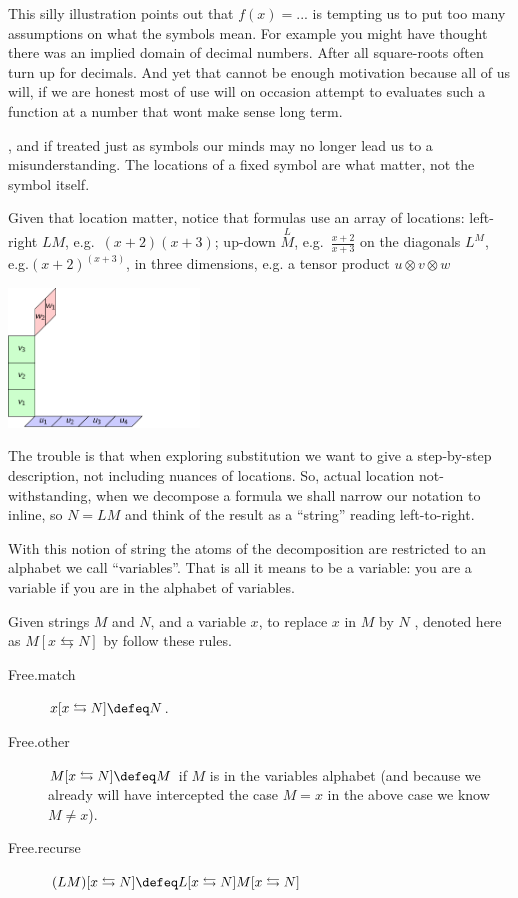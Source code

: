 This silly illustration points out that $f(x)=...$ 
is tempting us to put too many assumptions on what the symbols mean.
For example you might have thought there was an implied domain of decimal numbers.
After all square-roots often turn up for decimals.  And yet that cannot be 
enough motivation because all of us will, if we are honest most of use will on occasion 
attempt to evaluates such a function at a number that wont make sense long term.


, and if treated 
just as symbols our minds may no longer lead us to a misunderstanding.  The locations
of a fixed symbol are what matter, not the symbol itself.

Given that location matter, notice that formulas use an array of locations:
left-right $LM$, e.g.\ $(x+2)(x+3)$; up-down $\overset{L}{M}$, e.g.\ $\frac{x+2}{x+3}$
on the diagonals $L^M$, e.g.$(x+2)^{(x+3)}$, in three dimensions, e.g. a tensor product $u\otimes v\otimes w$
    \begin{center}
        \includegraphics[width=2in,page=26]{Tensor-Product-Def-3D.pdf}
    \end{center}
The trouble is that when exploring substitution we want to give a step-by-step 
description, not including nuances of locations.  So, actual location not-withstanding,
when we decompose a formula we shall narrow 
our notation to inline, so $N=LM$ and think of the result as a ``string'' reading 
left-to-right.

With this notion of string the atoms of the decomposition are restricted to an
alphabet we call ``variables''. That is all it means to be a variable: you are a
variable if you are in the alphabet of variables.  

\begin{definition}
    Given strings $M$ and $N$, and a variable $x$, to replace $x$ in $M$ by $N$ ,
    denoted here as $M[x\leftrightarrows N]$ by follow these rules.
    \begin{description}
        \item[Free.match] $x[x\leftrightarrows N]\defeq N$.
        \item[Free.other] $M[x\leftrightarrows N]\defeq M$ if $M$ is in the variables alphabet (and 
        because we already will have intercepted the case $M=x$ in the above case we know $M\neq x$).
        
        \item[Free.recurse] $(LM)[x\leftrightarrows N]\defeq L[x\leftrightarrows N]M[x\leftrightarrows N]$
    \end{description}
\end{definition}

